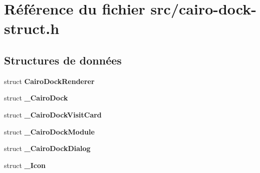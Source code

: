\section{Référence du fichier src/cairo-dock-struct.h}
\label{cairo-dock-struct_8h}
\subsection*{Structures de données}
\begin{CompactItemize}
\item 
struct {\bf CairoDockRenderer}
\item 
struct {\bf \_\-CairoDock}
\item 
struct {\bf \_\-CairoDockVisitCard}
\item 
struct {\bf \_\-CairoDockModule}
\item 
struct {\bf \_\-CairoDockDialog}
\item 
struct {\bf \_\-Icon}
\end{CompactItemize}
